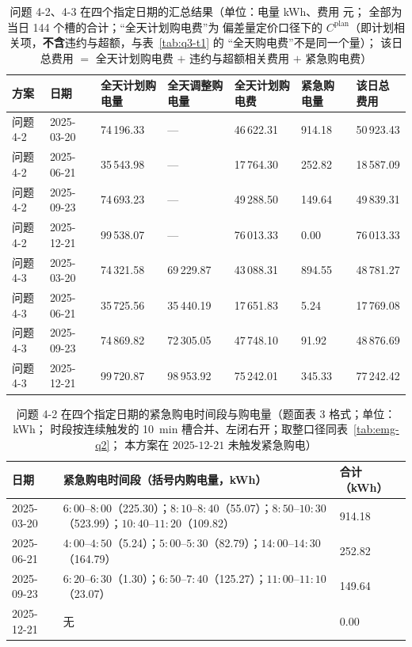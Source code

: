 \begin{table}[htbp]
  \centering
  \caption{问题 4-2、4-3 在四个指定日期的汇总结果（单位：电量 kWh、费用 元；
           全部为当日 144 个槽的合计；“全天计划购电费”为  偏差量定价口径下的
           \(C^{\text{plan}}\)（即计划相关项，\textbf{不含}违约与超额，与表~\ref{tab:q3-t1} 的
           “全天购电费”不是同一个量）；
           该日总费用 \(=\) 全天计划购电费 \(+\) 违约与超额相关费用 \(+\) 紧急购电费）}
  \label{tab:key4}
  \footnotesize
  \setlength{\tabcolsep}{3.5pt}
  \begin{tabular}{C{1.35cm} C{1.75cm} C{2.10cm} C{2.10cm} C{1.85cm} C{1.75cm} C{1.75cm}}
    \toprule
    方案 & 日期 & 全天计划购电量 & 全天调整购电量 & 全天计划购电费 & 紧急购电量 & 该日总费用 \\
    \midrule
问题 4-2 & 2025-03-20 & 74\,196.33 & --- & 46\,622.31 & 914.18 & 50\,923.43 \\
    问题 4-2 & 2025-06-21 & 35\,543.98 & --- & 17\,764.30 & 252.82 & 18\,587.09 \\
    问题 4-2 & 2025-09-23 & 74\,693.23 & --- & 49\,288.50 & 149.64 & 49\,839.31 \\
    问题 4-2 & 2025-12-21 & 99\,538.07 & --- & 76\,013.33 & 0.00 & 76\,013.33 \\
    \midrule
    问题 4-3 & 2025-03-20 & 74\,321.58 & 69\,229.87 & 43\,088.31 & 894.55 & 48\,781.27 \\
    问题 4-3 & 2025-06-21 & 35\,725.56 & 35\,440.19 & 17\,651.83 & 5.24 & 17\,769.08 \\
    问题 4-3 & 2025-09-23 & 74\,869.82 & 72\,305.05 & 47\,748.10 & 91.92 & 48\,876.69 \\
    问题 4-3 & 2025-12-21 & 99\,720.87 & 98\,953.92 & 75\,242.01 & 345.33 & 77\,242.42 \\
    \bottomrule
  \end{tabular}
\end{table}


\begin{table}[htbp]
  \centering
  \caption{问题 4-2 在四个指定日期的紧急购电时间段与购电量（题面表 3 格式；单位：kWh；
            时段按连续触发的 10~min 槽合并、左闭右开；取整口径同表~\ref{tab:emg-q2}；
            本方案在 \(2025\text{-}12\text{-}21\) 未触发紧急购电）}
  \label{tab:emg-q42}
  \footnotesize
  \setlength{\tabcolsep}{4pt}
  \begin{tabular}{C{1.85cm} L{9.30cm} C{1.85cm}}
    \toprule
    日期 & 紧急购电时间段（括号内购电量，kWh） & 合计（kWh） \\
    -03-20 & \(6{:}00\)--\(8{:}00\)（225.30）；\(8{:}10\)--\(8{:}40\)（55.07）；\(8{:}50\)--\(10{:}30\)（523.99）；\(10{:}40\)--\(11{:}20\)（109.82） & 914.18 \\
    2025-06-21 & \(4{:}00\)--\(4{:}50\)（5.24）；\(5{:}00\)--\(5{:}30\)（82.79）；\(14{:}00\)--\(14{:}30\)（164.79） & 252.82 \\
    2025-09-23 & \(6{:}20\)--\(6{:}30\)（1.30）；\(6{:}50\)--\(7{:}40\)（125.27）；\(11{:}00\)--\(11{:}10\)（23.07） & 149.64 \\
    2025-12-21 & 无 & 0.00 \\
    \bottomrule
  \end{tabular}
\end{table}

